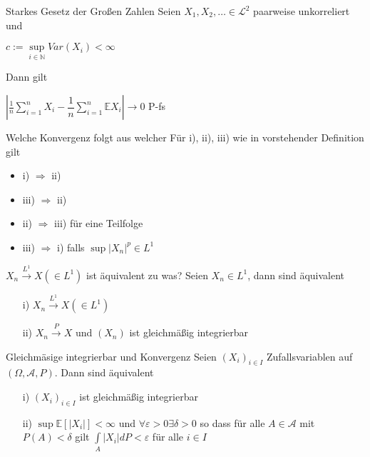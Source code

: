 \documentclass[avery5371,grid,frame]{flashcards} %
\newcommand{\E}{\mathbb{E}}
\newcommand{\1}{ \mathbb{1} } %
\begin{document}
\begin{flashcard}[Satz]{Starkes Gesetz der Großen Zahlen}
  Seien $X_1,X_2,\ldots \in \mathcal{L}^2$ paarweise unkorreliert und
  \begin{center}
    $c:=\sup\limits_{i \in \mathbb{N}} Var(X_i) < \infty$
  \end{center}
  Dann gilt
  \begin{center}
    $\left|\frac{1}{n}\sum\limits_{i=1}^nX_i-\dfrac{1}{n}\sum\limits_{i=1}^n\mathbb{E}X_i\right|
    \to 0$ P-fs
  \end{center}
\end{flashcard}

\begin{flashcard}[Satz]{Welche Konvergenz folgt aus welcher}
  Für i), ii), iii) wie in vorstehender Definition gilt
  \begin{itemize}
  \item i) $\Rightarrow$ ii)
  \item iii) $\Rightarrow$ ii)
  \item ii) $\Rightarrow$ iii) für eine Teilfolge
  \item iii) $\Rightarrow$ i) falls $\sup|X_n|^p \in L^1$
  \end{itemize}
\end{flashcard}

\begin{flashcard}[Satz]{$X_n \overset{L^1}{\to} X (\in L^1)$ ist äquivalent zu was?}
  \label{prop:LkonvergenzUndPkonvergenz}
  Seien $X_n \in L^1$, dann sind äquivalent
  \begin{itemize}
  \item[i)] $X_n \overset{L^1}{\to} X (\in L^1)$
  \item[ii)] $X_n \overset{P}{\to} X$ und $(X_n)$ ist gleichmäßig integrierbar
  \end{itemize}
\end{flashcard}

\begin{flashcard}[Satz]{ Gleichmäsige integrierbar und Konvergenz}
  Seien $(X_i)_{i \in I}$ Zufallsvariablen auf $(\Omega, \mathcal{A},P)$. Dann sind
  äquivalent
  \begin{itemize}
  \item[i)] $(X_i)_{i \in I}$ ist gleichmäßig integrierbar
  \item[ii)] $\sup \E [|X_i|]< \infty$ und $\forall \varepsilon > 0
    \exists \delta >0$ so dass für alle $A \in \mathcal{A}$ mit $P(A)<
    \delta$ gilt $\int\limits_A |X_i|dP<\varepsilon$ für alle $i \in I$
  \end{itemize}
\end{flashcard}
\end{document}
